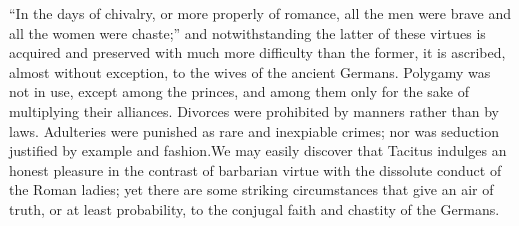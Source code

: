 


“In the days of chivalry, or more properly of romance, all the
men were brave and all the women were chaste;” and
notwithstanding the latter of these virtues is acquired and
preserved with much more difficulty than the former, it is
ascribed, almost without exception, to the wives of the ancient
Germans. Polygamy was not in use, except among the princes, and
among them only for the sake of multiplying their alliances.
Divorces were prohibited by manners rather than by laws.
Adulteries were punished as rare and inexpiable crimes; nor was
seduction justified by example and fashion.\footnotemark[56] We may easily
discover that Tacitus indulges an honest pleasure in the contrast
of barbarian virtue with the dissolute conduct of the Roman
ladies; yet there are some striking circumstances that give an
air of truth, or at least probability, to the conjugal faith and
chastity of the Germans.


